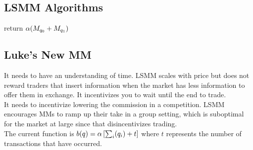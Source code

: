 \subsection{LSMM Algorithms}
\begin{algorithm}[H]
\TitleOfAlgo{$\LMSRb(\LMSRAlpha)$}
return $\alpha (M_{q_0} + M_{q_1})$\;
\end{algorithm}

\subsection{Luke's New MM}

It needs to have an understanding of time. LSMM scales with price but does not reward traders that insert information when the market has less information to offer them in exchange. It incentivizes you to wait until the
end to trade. \\

It needs to incentivize lowering the commission in a competition. LSMM 
encourages MMs to ramp up their take in a group setting, which is
suboptimal for the market at large since that disincentivizes trading. \\

The current function is $b(q) = \alpha \left[\sum_{i}(q_i) + t \right]$ where $t$ represents the number of transactions that have occurred.
